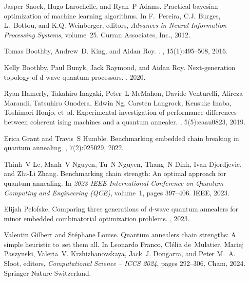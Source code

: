 \documentclass[showpacs,twocolumn,superscriptaddress]{revtex4-2}
\begin{document}
\begin{thebibliography}{10}
Jasper Snoek, Hugo Larochelle, and Ryan~P Adams.
\newblock Practical bayesian optimization of machine learning algorithms.
\newblock In F.~Pereira, C.J. Burges, L.~Bottou, and K.Q. Weinberger, editors,
  {\em Advances in Neural Information Processing Systems}, volume~25. Curran
  Associates, Inc., 2012.

Tomas Boothby, Andrew~D. King, and Aidan Roy.
.
, 15(1):495--508, 2016.

Kelly Boothby, Paul Bunyk, Jack Raymond, and Aidan Roy.
\newblock Next-generation topology of d-wave quantum processors.
, 2020.

Ryan Hamerly, Takahiro Inagaki, Peter~L McMahon, Davide Venturelli, Alireza
  Marandi, Tatsuhiro Onodera, Edwin Ng, Carsten Langrock, Kensuke Inaba,
  Toshimori Honjo, et~al.
\newblock Experimental investigation of performance differences between
  coherent ising machines and a quantum annealer.
, 5(5):eaau0823, 2019.

Erica Grant and Travis~S Humble.
\newblock Benchmarking embedded chain breaking in quantum annealing.
, 7(2):025029, 2022.

Thinh~V Le, Manh~V Nguyen, Tu~N Nguyen, Thang~N Dinh, Ivan Djordjevic, and
  Zhi-Li Zhang.
\newblock Benchmarking chain strength: An optimal approach for quantum
  annealing.
\newblock In {\em 2023 IEEE International Conference on Quantum Computing and
  Engineering (QCE)}, volume~1, pages 397--406. IEEE, 2023.

Elijah Pelofske.
\newblock Comparing three generations of d-wave quantum annealers for minor
  embedded combinatorial optimization problems.
, 2023.

Valentin Gilbert and St{\'e}phane Louise.
\newblock Quantum annealers chain strengths: A simple heuristic to set them
  all.
\newblock In Leonardo Franco, Cl{\'e}lia de~Mulatier, Maciej Paszynski,
  Valeria~V. Krzhizhanovskaya, Jack~J. Dongarra, and Peter M.~A. Sloot,
  editors, {\em Computational Science -- ICCS 2024}, pages 292--306, Cham,
  2024. Springer Nature Switzerland.

\end{thebibliography}
\end{document}
